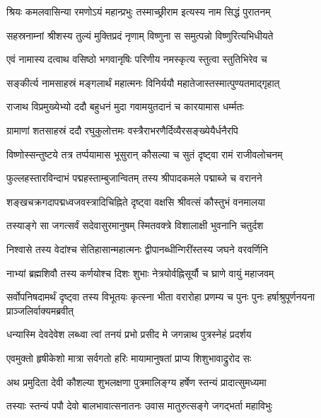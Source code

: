 \twolineshloka
{श्रियः कमलवासिन्या रमणोऽयं महान्प्रभुः}
{तस्माच्छ्रीराम इत्यस्य नाम सिद्धं पुरातनम्}%

\twolineshloka
{सहस्रनाम्नां श्रीशस्य तुल्यं मुक्तिप्रदं नृणाम्}
{विष्णुना स समुत्पन्नो विष्णुरित्यभिधीयते}%

\twolineshloka
{एवं नामास्य दत्वाथ वसिष्ठो भगवानृषिः}
{परिणीय नमस्कृत्य स्तुत्वा स्तुतिभिरेव च}%

\twolineshloka
{सङ्कीर्त्य नामसाहस्रं मङ्गलार्थं महात्मनः}
{विनिर्ययौ महातेजास्तस्मात्पुण्यतमाद्गृहात्}%

\twolineshloka
{राजाथ विप्रमुख्येभ्यो ददौ बहुधनं मुदा}
{गवामयुतदानं च कारयामास धर्म्मतः}%

\twolineshloka
{ग्रामाणां शतसाहस्रं ददौ रघुकुलोत्तमः}
{वस्त्रैराभरणैर्दिव्यैरसङ्ख्येयैर्धनैरपि}%

\twolineshloka
{विष्णोस्सन्तुष्टये तत्र तर्प्पयामास भूसुरान्}
{कौसल्या च सुतं दृष्ट्वा रामं राजीवलोचनम्}%

\twolineshloka
{फुल्लहस्तारविन्दाभं पद्महस्ताम्बुजान्वितम्}
{तस्य श्रीपादकमले पद्माब्जे च वरानने}%

\twolineshloka
{शङ्खचक्रगदापद्मध्वजवस्त्रादिचिह्निते}
{दृष्ट्वा वक्षसि श्रीवत्सं कौस्तुभं वनमालया}%

\twolineshloka
{तस्याङ्गे सा जगत्सर्वं सदेवासुरमानुषम्}
{स्मितवक्त्रे विशालाक्षी भुवनानि चतुर्दश}%

\twolineshloka
{निश्वासे तस्य वेदांश्च सेतिहासान्महात्मनः}
{द्वीपानब्धीन्गिरींस्तस्य जघने वरवर्णिनि}%

\twolineshloka
{नाभ्यां ब्रह्मशिवौ तस्य कर्णयोश्च दिशः शुभाः}
{नेत्रयोर्वह्निसूर्यौ च घ्राणे वायुं महाजवम्}%


\threelineshloka
{सर्वोपनिषदामर्थं दृष्ट्वा तस्य विभूतयः}
{कृत्स्ना भीता वरारोहा प्रणम्य च पुनः पुनः}
{हर्षाश्रुपूर्णनयना प्राञ्जलिर्वाक्यमब्रवीत्}%


\twolineshloka
{धन्यास्मि देवदेवेश लब्ध्वा त्वां तनयं प्रभो}
{प्रसीद मे जगन्नाथ पुत्रस्नेहं प्रदर्शय}%


\twolineshloka
{एवमुक्तो हृषीकेशो मात्रा सर्वगतो हरिः}
{मायामानुषतां प्राप्य शिशुभावाद्रुरोद सः}%

\twolineshloka
{अथ प्रमुदिता देवी कौशल्या शुभलक्षणा}
{पुत्रमालिङ्ग्य हर्षेण स्तन्यं प्रादात्सुमध्यमा}%

\twolineshloka
{तस्याः स्तन्यं पपौ देवो बालभावात्सनातनः}
{उवास मातुरुत्सङ्गे जगद्भर्ता महाविभुः}%

